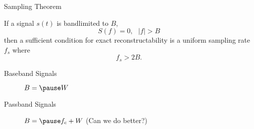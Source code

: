 \documentclass[t]{beamer}
\begin{document}
\begin{frame}{Sampling Theorem}
  \pause
  \begin{theorem}
  If a signal $s(t)$ is bandlimited to $B$, 
  \begin{equation*}
    S(f) = 0, \ \ \ |f| > B  
  \end{equation*}
  then a sufficient condition for exact reconstructability is a uniform sampling rate $f_s$ where
  \pause
  \begin{equation*}
  f_s > 2B.
  \end{equation*}
  \end{theorem}
  \pause
  \begin{description}
    \item[Baseband Signals] $B = \pause W$
    \pause
    \item[Passband Signals] $B = \pause f_c+W$ \pause \alert{(Can we do better?)}
  \end{description}
\end{frame}
\end{document}

